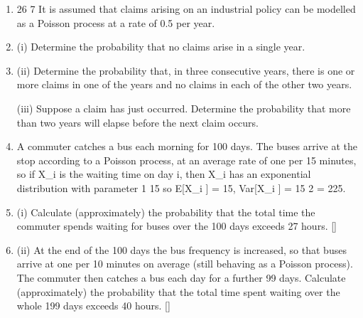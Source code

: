 \documentclass[a4paper,12pt]{article}
\begin{document}
\begin{enumerate}
\item 
26
7
It is assumed that claims arising on an industrial policy can be modelled as a Poisson
process at a rate of 0.5 per year.
\item (i) Determine the probability that no claims arise in a single year.

\item (ii) Determine the probability that, in three consecutive years, there is one or more
claims in one of the years and no claims in each of the other two years.

(iii) Suppose a claim has just occurred. Determine the probability that more than
two years will elapse before the next claim occurs.
\item 
A commuter catches a bus each morning for 100 days. The buses arrive at the stop
according to a Poisson process, at an average rate of one per 15 minutes, so if X_{i} is the
waiting time on day i, then X_{i} has an exponential distribution with parameter
1
15
so
E[X_{i} ] = 15, Var[X_{i} ] = 15 2 = 225.
\item (i) Calculate (approximately) the probability that the total time the commuter
spends waiting for buses over the 100 days exceeds 27 hours.
[]
\item (ii) At the end of the 100 days the bus frequency is increased, so that buses arrive
at one per 10 minutes on average (still behaving as a Poisson process). The
commuter then catches a bus each day for a further 99 days. Calculate
(approximately) the probability that the total time spent waiting over the
whole 199 days exceeds 40 hours.
[]
\newpage




\end{enumerate}
\end{document}
